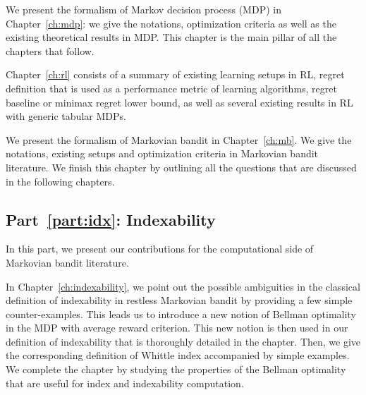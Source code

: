 We present the formalism of Markov decision process (MDP) in Chapter~\ref{ch:mdp}: we give the notations, optimization criteria as well as the existing theoretical results in MDP.
This chapter is the main pillar of all the chapters that follow.

Chapter~\ref{ch:rl} consists of a summary of existing learning setups in RL, regret definition that is used as a performance metric of learning algorithms, regret baseline or minimax regret lower bound, as well as several existing results in RL with generic tabular MDPs.

We present the formalism of Markovian bandit in Chapter~\ref{ch:mb}. We give the notations, existing setups and optimization criteria in Markovian bandit literature.
We finish this chapter by outlining all the questions that are discussed in the following chapters.

\subsection{Part~{\ref{part:idx}}: Indexability}

In this part, we present our contributions for the computational side of Markovian bandit literature.

In Chapter~\ref{ch:indexability}, we point out the possible ambiguities in the classical definition of indexability in restless Markovian bandit by providing a few simple counter-examples.
This leads us to introduce a new notion of Bellman optimality in the MDP with average reward criterion.
This new notion is then used in our definition of indexability that is thoroughly detailed in the chapter.
Then, we give the corresponding definition of Whittle index accompanied by simple examples.
We complete the chapter by studying the properties of the Bellman optimality that are useful for index and indexability computation.

